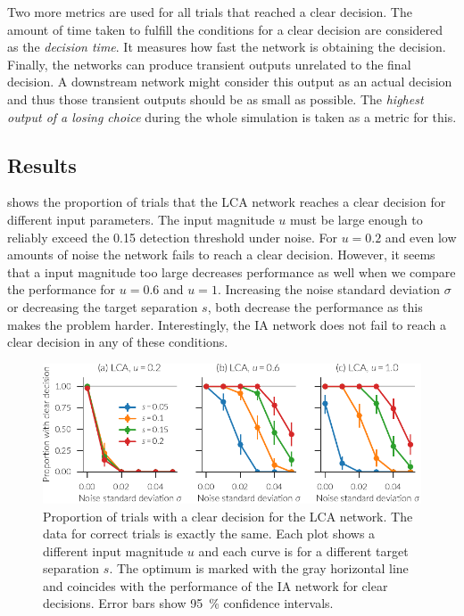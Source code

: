 Two more metrics are used for all trials that reached a clear decision.
The amount of time taken to fulfill the conditions for a clear decision are considered as the \emph{decision time}.
It measures how fast the network is obtaining the decision.
Finally, the networks can produce transient outputs unrelated to the final decision.
A downstream network might consider this output as an actual decision and thus those transient outputs should be as small as possible.
The \emph{highest output of a losing choice} during the whole simulation is taken as a metric for this.


\subsection{Results}
 shows the proportion of trials that the LCA network reaches a clear decision for different input parameters.
The input magnitude $u$ must be large enough to reliably exceed the \num{0.15} detection threshold under noise.
For $u = 0.2$ and even low amounts of noise the network fails to reach a clear decision.
However, it seems that a input magnitude too large decreases performance as well when we compare the performance for $u=0.6$ and $u=1$.
Increasing the noise standard deviation $\sigma$ or decreasing the target separation $s$, both decrease the performance as this makes the problem harder.
Interestingly, the IA network does not fail to reach a clear decision in any of these conditions.
\begin{figure}
    \centering
    \includegraphics{figures/ia-clear}
    \caption[Proportion of trials with a clear decision for the LCA network]{Proportion of trials with a clear decision for the LCA network. The data for correct trials is exactly the same. Each plot shows a different input magnitude $u$ and each curve is for a different target separation $s$. The optimum is marked with the gray horizontal line and coincides with the performance of the IA network for clear decisions. Error bars show \SI{95}{\percent} confidence intervals.}\label{fig:ia-clear}
\end{figure}

